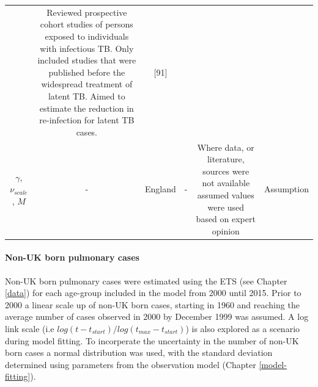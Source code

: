 \documentclass[11pt,twoside]{bristolthesis}
\begin{document}
\begin{longtable}[]{@{}cccccc@{}}
\begin{minipage}[t]{0.08\columnwidth}
  \end{minipage} & \begin{minipage}[t]{0.29\columnwidth}\centering
  Reviewed prospective cohort studies of
  persons exposed to individuals with
  infectious TB. Only included studies
  that were published before the
  widespread treatment of latent TB. Aimed
  to estimate the reduction in
  re-infection for latent TB cases.\strut
  \end{minipage} & \begin{minipage}[t]{0.12\columnwidth}\centering
  {[}91{]}\strut
  \end{minipage}\tabularnewline
  \begin{minipage}[t]{0.16\columnwidth}\centering
  \(\gamma\),
  \(\nu_{scale}\),
  \(M\)\strut
  \end{minipage} & \begin{minipage}[t]{0.11\columnwidth}\centering
  -\strut
  \end{minipage} & \begin{minipage}[t]{0.08\columnwidth}\centering
  England\strut
  \end{minipage} & \begin{minipage}[t]{0.08\columnwidth}\centering
  -\strut
  \end{minipage} & \begin{minipage}[t]{0.29\columnwidth}\centering
  Where data, or literature, sources were
  not available assumed values were used
  based on expert opinion\strut
  \end{minipage} & \begin{minipage}[t]{0.12\columnwidth}\centering
  Assumption\strut
  \end{minipage}\tabularnewline
  \bottomrule
  \end{longtable}
  \hypertarget{non-uk-born-pulmonary-cases}{%
  \paragraph{Non-UK born pulmonary cases}\label{non-uk-born-pulmonary-cases}}
  
  Non-UK born pulmonary cases were estimated using the ETS (see Chapter \ref{data}) for each age-group included in the model from 2000 until 2015. Prior to 2000 a linear scale up of non-UK born cases, starting in 1960 and reaching the average number of cases observed in 2000 by December 1999 was assumed. A log link scale (i.e \(log(t - t_{start})/log(t_{max} - t_{start})\)) is also explored as a scenario during model fitting. To incorperate the uncertainty in the number of non-UK born cases a normal distribution was used, with the standard deviation determined using parameters from the observation model (Chapter \ref{model-fitting}).
  
\end{document}
